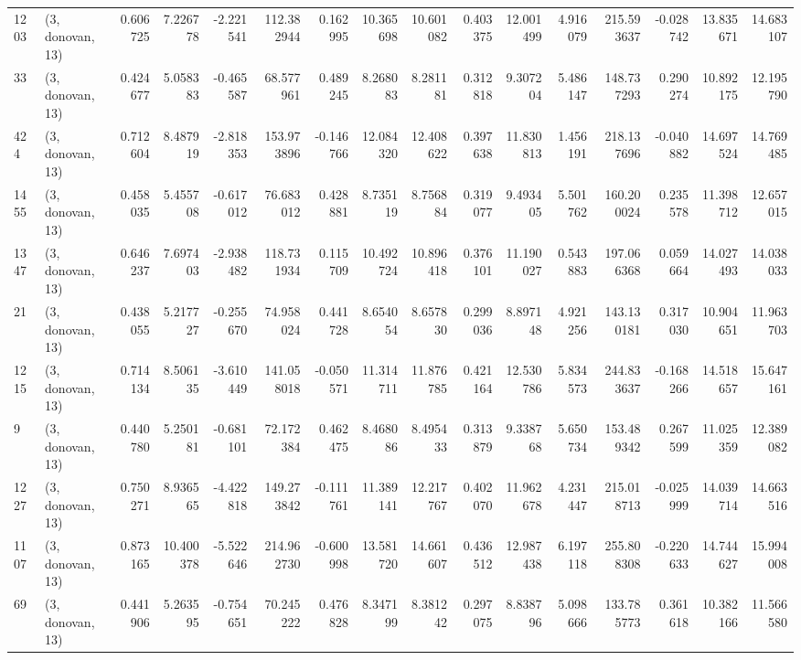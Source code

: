 \begin{tabular}{llrrrrrrrrrrrrrr}
1203 &  (3, donovan, 13) &   0.606725 &   7.226778 &  -2.221541 &    112.382944 &    0.162995 &   10.365698 &   10.601082 &  0.403375 &  12.001499 &   4.916079 &   215.593637 &  -0.028742 &  13.835671 &  14.683107 \\
33   &  (3, donovan, 13) &   0.424677 &   5.058383 &  -0.465587 &     68.577961 &    0.489245 &    8.268083 &    8.281181 &  0.312818 &   9.307204 &   5.486147 &   148.737293 &   0.290274 &  10.892175 &  12.195790 \\
424  &  (3, donovan, 13) &   0.712604 &   8.487919 &  -2.818353 &    153.973896 &   -0.146766 &   12.084320 &   12.408622 &  0.397638 &  11.830813 &   1.456191 &   218.137696 &  -0.040882 &  14.697524 &  14.769485 \\
1455 &  (3, donovan, 13) &   0.458035 &   5.455708 &  -0.617012 &     76.683012 &    0.428881 &    8.735119 &    8.756884 &  0.319077 &   9.493405 &   5.501762 &   160.200024 &   0.235578 &  11.398712 &  12.657015 \\
1347 &  (3, donovan, 13) &   0.646237 &   7.697403 &  -2.938482 &    118.731934 &    0.115709 &   10.492724 &   10.896418 &  0.376101 &  11.190027 &   0.543883 &   197.066368 &   0.059664 &  14.027493 &  14.038033 \\
21   &  (3, donovan, 13) &   0.438055 &   5.217727 &  -0.255670 &     74.958024 &    0.441728 &    8.654054 &    8.657830 &  0.299036 &   8.897148 &   4.921256 &   143.130181 &   0.317030 &  10.904651 &  11.963703 \\
1215 &  (3, donovan, 13) &   0.714134 &   8.506135 &  -3.610449 &    141.058018 &   -0.050571 &   11.314711 &   11.876785 &  0.421164 &  12.530786 &   5.834573 &   244.833637 &  -0.168266 &  14.518657 &  15.647161 \\
9    &  (3, donovan, 13) &   0.440780 &   5.250181 &  -0.681101 &     72.172384 &    0.462475 &    8.468086 &    8.495433 &  0.313879 &   9.338768 &   5.650734 &   153.489342 &   0.267599 &  11.025359 &  12.389082 \\
1227 &  (3, donovan, 13) &   0.750271 &   8.936565 &  -4.422818 &    149.273842 &   -0.111761 &   11.389141 &   12.217767 &  0.402070 &  11.962678 &   4.231447 &   215.018713 &  -0.025999 &  14.039714 &  14.663516 \\
1107 &  (3, donovan, 13) &   0.873165 &  10.400378 &  -5.522646 &    214.962730 &   -0.600998 &   13.581720 &   14.661607 &  0.436512 &  12.987438 &   6.197118 &   255.808308 &  -0.220633 &  14.744627 &  15.994008 \\
69   &  (3, donovan, 13) &   0.441906 &   5.263595 &  -0.754651 &     70.245222 &    0.476828 &    8.347199 &    8.381242 &  0.297075 &   8.838796 &   5.098666 &   133.785773 &   0.361618 &  10.382166 &  11.566580 \\

\end{tabular}
